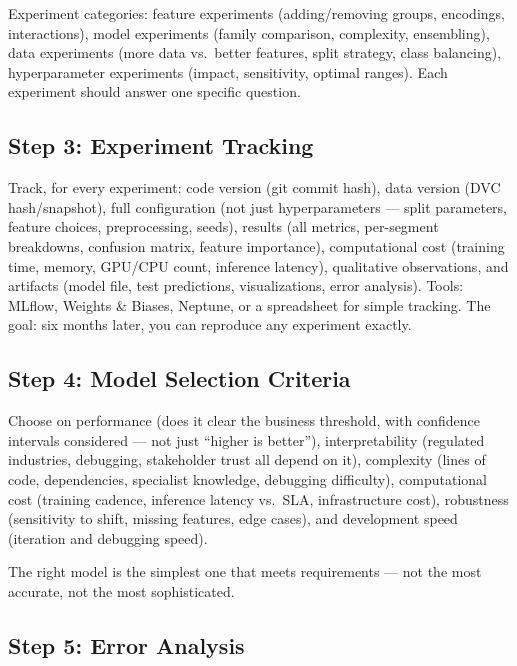 Experiment categories: feature experiments (adding/removing groups, encodings, interactions), model experiments
(family comparison, complexity, ensembling), data experiments (more data vs.\ better features, split strategy,
class balancing), hyperparameter experiments (impact, sensitivity, optimal ranges). Each experiment should answer
one specific question.

\subsection{Step 3: Experiment Tracking}

Track, for every experiment: code version (git commit hash), data version (DVC hash/snapshot), full configuration
(not just hyperparameters --- split parameters, feature choices, preprocessing, seeds), results (all metrics,
per-segment breakdowns, confusion matrix, feature importance), computational cost (training time, memory, GPU/CPU
count, inference latency), qualitative observations, and artifacts (model file, test predictions, visualizations,
error analysis). Tools: MLflow, Weights \& Biases, Neptune, or a spreadsheet for simple tracking. The goal: six
months later, you can reproduce any experiment exactly.

\subsection{Step 4: Model Selection Criteria}

Choose on performance (does it clear the business threshold, with confidence intervals considered --- not just
``higher is better''), interpretability (regulated industries, debugging, stakeholder trust all depend on it),
complexity (lines of code, dependencies, specialist knowledge, debugging difficulty), computational cost (training
cadence, inference latency vs.\ SLA, infrastructure cost), robustness (sensitivity to shift, missing features,
edge cases), and development speed (iteration and debugging speed).

\begin{keytakeaway}
The right model is the simplest one that meets requirements --- not the most accurate, not the most sophisticated.
\end{keytakeaway}

\subsection{Step 5: Error Analysis}

